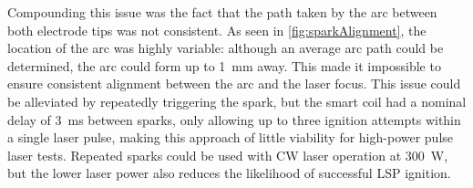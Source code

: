             Compounding this issue was the fact that the path taken by the arc between both electrode tips was not consistent. As seen in \autoref{fig:sparkAlignment}, the location of the arc was highly variable: although an average arc path could be determined, the arc could form up to \qty{1}{mm} away. This made it impossible to ensure consistent alignment between the arc and the laser focus. This issue could be alleviated by repeatedly triggering the spark, but the smart coil had a nominal delay of \qty{3}{ms} between sparks, only allowing up to three ignition attempts within a single laser pulse, making this approach of little viability for high-power pulse laser tests. Repeated sparks could be used with CW laser operation at \qty{300}{W}, but the lower laser power also reduces the likelihood of successful LSP ignition.

